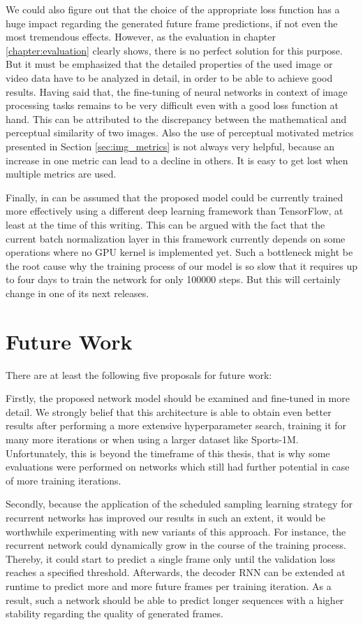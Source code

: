 We could also figure out that the choice of the appropriate loss function has a huge impact regarding the generated future frame predictions, if not even the most tremendous effects. However, as the evaluation in chapter \ref{chapter:evaluation} clearly shows, there is no perfect solution for this purpose. But it must be emphasized that the detailed properties of the used image or video data have to be analyzed in detail, in order to be able to achieve good results. Having said that, the fine-tuning of neural networks in context of image processing tasks remains to be very difficult even with a good loss function at hand. This can be attributed to the discrepancy between the mathematical and perceptual similarity of two images. Also the use of perceptual motivated metrics presented in Section \ref{sec:img_metrics} is not always very helpful, because an increase in one metric can lead to a decline in others. It is easy to get lost when multiple metrics are used.

Finally, in can be assumed that the proposed model could be currently trained more effectively using a different deep learning framework than TensorFlow, at least at the time of this writing. This can be argued with the fact that the current batch normalization layer in this framework currently depends on some operations where no GPU kernel is implemented yet. Such a bottleneck might be the root cause why the training process of our model is so slow that it requires up to four days to train the network for only \num{100000} steps. But this will certainly change in one of its next releases.


\section{Future Work}

There are at least the following five proposals for future work:

Firstly, the proposed network model should be examined and fine-tuned in more detail. We strongly belief that this architecture is able to obtain even better results after performing a more extensive hyperparameter search, training it for many more iterations or when using a larger dataset like Sports-1M. Unfortunately, this is beyond the timeframe of this thesis, that is why some evaluations were performed on networks which still had further potential in case of more training iterations.

Secondly, because the application of the scheduled sampling learning strategy for recurrent networks has improved our results in such an extent, it would be worthwhile experimenting with new variants of this approach. For instance, the recurrent network could dynamically grow in the course of the training process. Thereby, it could start to predict a single frame only until the validation loss reaches a specified threshold. Afterwards, the decoder RNN can be extended at runtime to predict more and more future frames per training iteration. As a result, such a network should be able to predict longer sequences with a higher stability regarding the quality of generated frames. 

